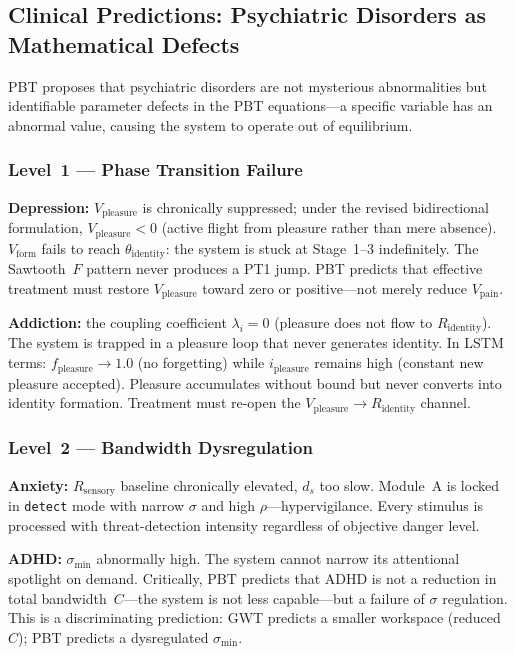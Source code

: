 \documentclass[12pt,a4paper]{article}
\newcommand{\Rsens}{R_{\mathrm{sensory}}}
\newcommand{\Rid}{R_{\mathrm{identity}}}
\newcommand{\Vform}{V_{\mathrm{form}}}
\newcommand{\vpain}{V_{\mathrm{pain}}}
\newcommand{\vpleasure}{V_{\mathrm{pleasure}}}
\begin{document}
\subsection{Clinical Predictions: Psychiatric Disorders as Mathematical Defects}

PBT proposes that psychiatric disorders are not mysterious abnormalities but
identifiable parameter defects in the PBT equations---a specific variable has
an abnormal value, causing the system to operate out of equilibrium.

\subsubsection{Level~1 --- Phase Transition Failure}

\textbf{Depression:} $\vpleasure$ is chronically suppressed; under the
revised bidirectional formulation, $\vpleasure < 0$ (active flight from pleasure
rather than mere absence). $\Vform$ fails to reach $\theta_{\mathrm{identity}}$:
the system is stuck at Stage~1--3 indefinitely. The Sawtooth~$F$ pattern never
produces a PT1 jump. PBT predicts that effective treatment must restore
$\vpleasure$ toward zero or positive---not merely reduce $\vpain$.

\textbf{Addiction:} the coupling coefficient $\lambda_i = 0$ (pleasure does not
flow to $\Rid$). The system is trapped in a pleasure loop that never generates
identity. In LSTM terms: $f_{\mathrm{pleasure}}\to 1.0$ (no forgetting) while
$i_{\mathrm{pleasure}}$ remains high (constant new pleasure accepted). Pleasure
accumulates without bound but never converts into identity formation. Treatment
must re-open the $\vpleasure\to\Rid$ channel.

\subsubsection{Level~2 --- Bandwidth Dysregulation}

\textbf{Anxiety:} $\Rsens$ baseline chronically elevated, $d_s$ too slow.
Module~A is locked in \texttt{detect} mode with narrow $\sigma$ and high
$\rho$---hypervigilance. Every stimulus is processed with threat-detection
intensity regardless of objective danger level.

\textbf{ADHD:} $\sigma_{\min}$ abnormally high. The system cannot narrow its
attentional spotlight on demand. Critically, PBT predicts that ADHD is not a
reduction in total bandwidth~$C$---the system is not less capable---but a
failure of $\sigma$ regulation. This is a discriminating prediction: GWT
predicts a smaller workspace (reduced~$C$); PBT predicts a dysregulated
$\sigma_{\min}$.
\end{document}
